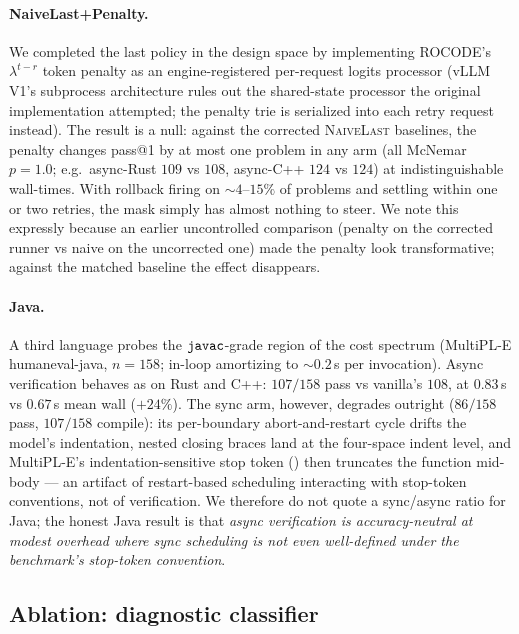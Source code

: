 \paragraph{NaiveLast+Penalty.} We completed the last policy in the
design space by implementing ROCODE's $\lambda^{t-r}$ token
penalty as an engine-registered per-request logits processor
(vLLM V1's subprocess architecture rules out the shared-state
processor the original implementation attempted; the penalty trie
is serialized into each retry request instead). The result is a
null: against the corrected \textsc{NaiveLast} baselines, the
penalty changes pass@1 by at most one problem in any arm (all
McNemar $p\!=\!1.0$; e.g.\ async-Rust $109$ vs $108$, async-C++
$124$ vs $124$) at indistinguishable wall-times. With rollback
firing on ${\sim}4$--$15\%$ of problems and settling within one or
two retries, the mask simply has almost nothing to steer. We note
this expressly because an earlier uncontrolled comparison
(penalty on the corrected runner vs naive on the uncorrected one)
made the penalty look transformative; against the matched baseline
the effect disappears.

\paragraph{Java.} A third language probes the
$\texttt{javac}$-grade region of the cost spectrum
(MultiPL-E humaneval-java, $n\!=\!158$;  in-loop
amortizing to ${\sim}0.2$\,s per invocation). Async verification behaves as
on Rust and C++: $107/158$ pass vs vanilla's $108$, at $0.83$\,s
vs $0.67$\,s mean wall ($+24\%$). The sync arm, however, degrades
outright ($86/158$ pass, $107/158$ compile): its per-boundary
abort-and-restart cycle drifts the model's indentation, nested
closing braces land at the four-space indent level, and
MultiPL-E's indentation-sensitive stop token () then truncates the function mid-body --- an artifact
of restart-based scheduling interacting with stop-token
conventions, not of verification. We therefore do not quote a
sync/async ratio for Java; the honest Java result is that
\emph{async verification is accuracy-neutral at modest overhead
where sync scheduling is not even well-defined under the
benchmark's stop-token convention}.

\subsection{Ablation: diagnostic classifier}\label{sec:results-ablation-classifier}

